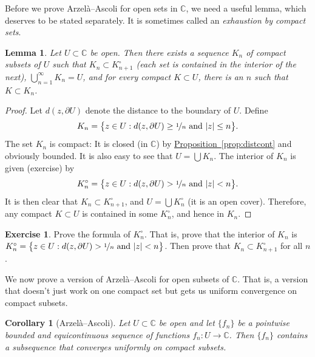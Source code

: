 \documentclass[12pt,openany]{book}
\newcommand{\sabs}[1]{\lvert {#1} \rvert}
\newcommand{\C}{{\mathbb{C}}}
\newcommand{\myindex}[1]{#1\index{#1}}
\theoremstyle{plain}
\newtheorem{lemma}[thm]{Lemma}
\newtheorem{cor}[thm]{Corollary}
\theoremstyle{remark}
\theoremstyle{definition}
\newenvironment{exbox}{%
    \def\FrameCommand{\vrule width 1pt \relax\hspace{10pt}}%
    \MakeFramed{\advance\hsize-\width\FrameRestore}%
}{%
    \endMakeFramed
}
\theoremstyle{exercise}
\newtheorem{exercise}{Exercise}[section]
\theoremstyle{example}
\newcommand{\propref}[1]{\hyperref[#1]{Proposition~\ref*{#1}}}
\begin{document}
Before we prove 
Arzel\`a--Ascoli for open sets in $\C$, we need a useful
lemma, which deserves to be stated separately.
It is sometimes called an \emph{\myindex{exhaustion by compact sets}}.

\begin{lemma}\label{lemma:compactexhaustion}
Let $U \subset \C$ be open.  Then there exists a sequence $K_n$
of compact subsets of $U$ such that $K_n \subset K^\circ_{n+1}$ (each set
is contained in the interior of the next), $\bigcup_{n=1}^\infty K_n = U$, and
for every compact $K \subset U$, there is an $n$ such that $K \subset K_n$.
\end{lemma}

\begin{proof}
Let $d(z,\partial U)$ denote the distance to the boundary of $U$.  Define
\begin{equation*}
K_n = \bigl\{
z \in U : d(z,\partial U) \geq \nicefrac{1}{n} \text{ and } \sabs{z} \leq
n
\bigr\} .
\end{equation*}
The set $K_n$ is compact: It is closed (in $\C$) by
\propref{prop:distcont} and obviously bounded.
It is also easy to see that $U = \bigcup K_n$.  The interior
of $K_n$ is given (exercise) by
\begin{equation*}
K^\circ_n =
\bigl\{
z \in U : d(z,\partial U) > \nicefrac{1}{n} \text{ and } \sabs{z} < n
\bigr\} .
\end{equation*}
It is then clear that $K_n \subset K^\circ_{n+1}$, and
$U = \bigcup K^\circ_n$ (it is an open cover).
Therefore, any compact $K \subset U$
is contained in some $K^\circ_n$, and hence in $K_n$.
\end{proof}

\begin{exbox}
\begin{exercise}
Prove the formula of $K^\circ_n$.  That is, prove that the interior
of $K_n$ is
$K^\circ_n = \bigl\{
z \in U : d(z,\partial U) > \nicefrac{1}{n} \text{ and } \sabs{z} < n
\bigr\}$.  Then prove that $K_n \subset K^\circ_{n+1}$ for all $n$.
\end{exercise}
\end{exbox}

We now prove a version of Arzel\`a--Ascoli for open subsets of $\C$.
That is, a version that doesn't just work on one compact set but gets
us uniform convergence on compact subsets.

\begin{cor}[Arzel\`a--Ascoli]
\label{cor:arzelaascoliplane}
Let $U \subset \C$ be open and let $\{ f_n \}$
be a pointwise bounded and equicontinuous sequence
of functions $f_n \colon U \to \C$.  Then
$\{ f_n \}$ contains a subsequence
that converges uniformly on compact subsets.
\end{cor}
\end{document}
